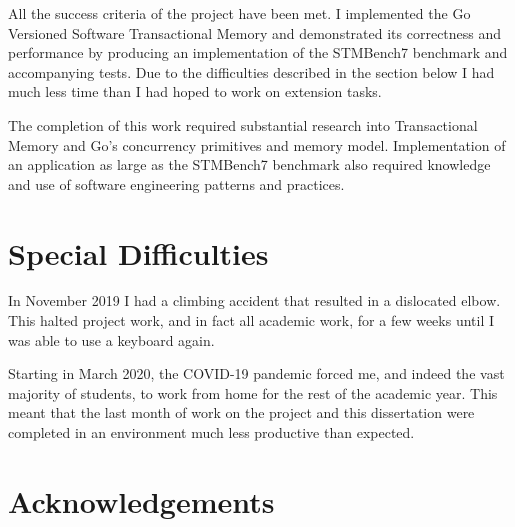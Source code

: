 \documentclass[12pt,a4paper,oneside,openright]{report}
\begin{document}
All the success criteria of the project have been met. I implemented
the Go Versioned Software Transactional Memory and demonstrated its
correctness and performance by producing an implementation of the
STMBench7 benchmark and accompanying tests. Due to the difficulties
described in the section below I had much less time than I had hoped
to work on extension tasks.

The completion of this work required substantial research into
Transactional Memory and Go's concurrency primitives and memory
model. Implementation of an application as large as the STMBench7
benchmark also required knowledge and use of software engineering
patterns and practices.

\vspace{-0.1in}

\section*{Special Difficulties}

In November 2019 I had a climbing accident that resulted in a
dislocated elbow. This halted project work, and in fact all academic
work, for a few weeks until I was able to use a keyboard again.

Starting in March 2020, the COVID-19 pandemic forced me, and indeed
the vast majority of students, to work from home for the rest of the
academic year. This meant that the last month of work on the project
and this dissertation were completed in an environment much less
productive than expected.

\newpage

\pagestyle{plain} 

\tableofcontents

\listoffigures{}

\listoftables{}


\newpage

\section*{Acknowledgements}



\pagestyle{headings}

\end{document}
